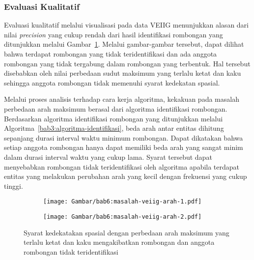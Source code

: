 \subsubsection{Evaluasi Kualitatif}
\label{subsubsec:veiig-qualitative}

Evaluasi kualitatif melalui visualisasi pada data VEIIG menunjukkan alasan dari nilai \textit{precision} yang cukup rendah dari hasil identifikasi rombongan yang ditunjukkan melalui Gambar~\ref{bab6:masalah-veiig-arah}. Melalui gambar-gambar tersebut, dapat dilihat bahwa terdapat rombongan yang tidak teridentifikasi dan ada anggota rombongan yang tidak tergabung dalam rombongan yang terbentuk. Hal tersebut disebabkan oleh nilai perbedaan sudut maksimum yang terlalu ketat dan kaku sehingga anggota rombongan tidak memenuhi syarat kedekatan spasial.

Melalui proses analisis terhadap cara kerja algoritma, kekakuan pada masalah perbedaan arah maksimum berasal dari algoritma identifikasi rombongan. Berdasarkan algoritma identifikasi rombongan yang ditunjukkan melalui Algoritma~\ref{bab3:algoritma-identifikasi}, beda arah antar entitas dihitung sepanjang durasi interval waktu minimum rombongan. Dapat dikatakan bahwa setiap anggota rombongan hanya dapat memiliki beda arah yang sangat minim dalam durasi interval waktu yang cukup lama. Syarat tersebut dapat menyebabkan rombongan tidak teridentifikasi oleh algoritma apabila terdapat entitas yang melakukan perubahan arah yang kecil dengan frekuensi yang cukup tinggi.

\begin{figure}[h]
    \centering
    \captionsetup{width=.65\textwidth}
    \begin{subfigure}[b]{0.225\textwidth}
        \centering
        \texttt{[image: Gambar/bab6:masalah-veiig-arah-1.pdf]}
    \end{subfigure}
    \begin{subfigure}[b]{0.225\textwidth}
        \centering
        \texttt{[image: Gambar/bab6:masalah-veiig-arah-2.pdf]}
    \end{subfigure}
    \caption[Masalah perbedaan arah maksimum pada data VEIIG]{Syarat kedekatakan spasial dengan perbedaan arah maksimum yang terlalu ketat dan kaku mengakibatkan rombongan dan anggota rombongan tidak teridentifikasi}
    \label{bab6:masalah-veiig-arah}
\end{figure}

